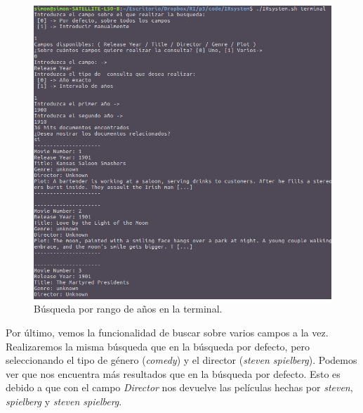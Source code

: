 \begin{itemize}
\begin{figure}[H]
	\centering
	\includegraphics[scale=0.45]{images/anyo.png}
	\caption{Búsqueda por rango de años en la terminal.}
\end{figure}
\newpage
Por último, vemos la funcionalidad de buscar sobre varios campos a la vez. Realizaremos la misma búsqueda que en la búsqueda por defecto, pero seleccionando el tipo de género (\textit{comedy}) y el director (\textit{steven spielberg}). Podemos ver que nos encuentra más resultados que en la búsqueda por defecto. Esto es debido a que con el campo \textit{Director} nos devuelve las películas hechas por \textit{steven}, \textit{spielberg} y \textit{steven spielberg}.


\end{itemize}
